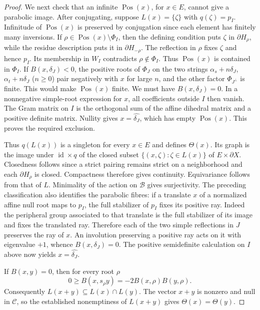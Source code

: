 \documentclass[11pt,reqno]{amsart}
\theoremstyle{plain}
\theoremstyle{definition}
\theoremstyle{remark}
\numberwithin{equation}{section}
\begin{document}
\begin{proof}
We next check that an infinite $\operatorname{Pos}(x)$, for $x\in E$,
cannot give a parabolic image. After conjugating, suppose
$L(x)=\{\zeta\}$ with $q(\zeta)=p_I$. Infinitude of
$\operatorname{Pos}(x)$ is preserved by conjugation since each
element has finitely many inversions. If
$\rho\in\operatorname{Pos}(x)\setminus\Phi_I$, then the defining
condition puts $\zeta$ in $\partial H_\rho$, while the residue
description puts it in $\partial H_{-\rho}$. The reflection in
$\rho$ fixes $\zeta$ and hence $p_I$. Its membership in $W_I$
contradicts $\rho\notin\Phi_I$. Thus $\operatorname{Pos}(x)$ is
contained in $\Phi_I$. If $B(x,\delta_J)<0$, the positive roots of
$\Phi_J$ on the two strings
$\alpha_s+n\delta_J$, $\alpha_t+n\delta_J$ ($n\geq0$)
pair negatively with $x$ for large $n$, and the other factor
$\Phi_{J^\perp}$ is finite. This would make
$\operatorname{Pos}(x)$ finite. We must have $B(x,\delta_J)=0$.
In a nonnegative simple-root expression for $x$, all coefficients
outside $I$ then vanish. The Gram matrix on $I$ is the orthogonal
sum of the affine dihedral matrix and a positive definite matrix.
Nullity gives $x=\widehat{\delta_J}$, which has empty
$\operatorname{Pos}(x)$. This proves the required exclusion.

Thus $q(L(x))$ is a singleton for every $x\in E$ and defines
$\Theta(x)$. Its graph is the image under
$\operatorname{id}\times q$ of the closed subset
$\{(x,\zeta):\zeta\in L(x)\}$ of $E\times\partial X$.
Closedness follows since a strict pairing remains strict on a
neighborhood and each $\partial H_\rho$ is closed. Compactness
therefore gives continuity. Equivariance follows from that of $L$.
Minimality of the action on $\mathcal B$ gives surjectivity.
The preceding classification also identifies the parabolic fibres:
if a translate $x$ of a normalized affine null root maps to $p_I$,
the full stabilizer of $p_I$ fixes its positive ray. Indeed the
peripheral group associated to that translate is the full stabilizer
of its image and fixes the translated ray. Therefore each of the
two simple reflections in $J$ preserves the ray of $x$. An involution
preserving a positive ray acts on it with eigenvalue $+1$, whence
$B(x,\delta_J)=0$. The positive semidefinite calculation on $I$
above now yields $x=\widehat{\delta_J}$.

If $B(x,y)=0$, then for every root $\rho$
\[
  0\geq B(x,s_\rho y)=-2B(x,\rho)B(y,\rho).
\]
Consequently $L(x+y)\subseteq L(x)\cap L(y)$. The vector $x+y$ is
nonzero and null in $\mathcal C$, so the established nonemptiness
of $L(x+y)$ gives $\Theta(x)=\Theta(y)$.


\end{proof}
\end{document}
